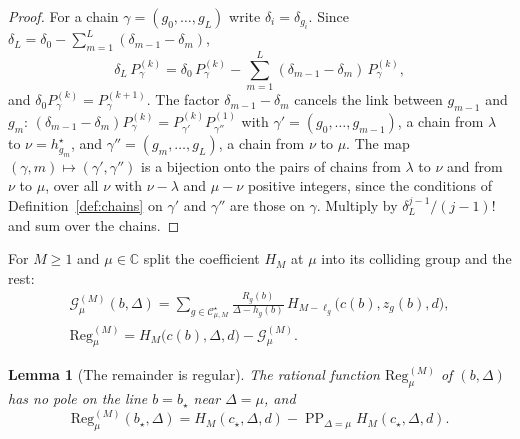 \documentclass[twoside,10pt]{article}
\numberwithin{equation}{section}
\theoremstyle{slbody}
\newtheorem{lemma}[theorem]{Lemma}
\theoremstyle{definition}
\theoremstyle{remark}
\newcommand{\PP}{\operatorname{PP}}
\begin{document}
\begin{proof}
For a chain $\gamma=(g_0,\dots,g_L)$ write $\delta_i=\delta_{g_i}$.  Since
$\delta_L=\delta_0-\sum_{m=1}^{L}(\delta_{m-1}-\delta_m)$,
\[
 \delta_L\,P^{(k)}_\gamma=\delta_0\,P^{(k)}_\gamma
 -\sum_{m=1}^{L}(\delta_{m-1}-\delta_m)\,P^{(k)}_\gamma ,
\]
and $\delta_0P^{(k)}_\gamma=P^{(k+1)}_\gamma$.  The factor
$\delta_{m-1}-\delta_m$ cancels the link between $g_{m-1}$ and $g_m$:
$(\delta_{m-1}-\delta_m)P^{(k)}_\gamma=P^{(k)}_{\gamma'}P^{(1)}_{\gamma''}$
with $\gamma'=(g_0,\dots,g_{m-1})$, a chain from $\lambda$ to $\nu=h^\star_{g_m}$,
and $\gamma''=(g_m,\dots,g_L)$, a chain from $\nu$ to $\mu$.  The map
$(\gamma,m)\mapsto(\gamma',\gamma'')$ is a bijection onto the pairs of chains
from $\lambda$ to $\nu$ and from $\nu$ to $\mu$, over all $\nu$ with
$\nu-\lambda$ and $\mu-\nu$ positive integers, since the conditions of
Definition~\ref{def:chains} on $\gamma'$ and $\gamma''$ are those on $\gamma$.
Multiply by $\delta_L^{j-1}/(j-1)!$ and sum over the chains.
\end{proof}

For $M\geq1$ and $\mu\in\mathbb C$ split the coefficient $H_M$ at $\mu$ into
its colliding group and the rest:
\begin{gather*}
 {\mathcal G}^{(M)}_\mu(b,\Delta)=\sum_{g\in{\mathcal C}^\star_{\mu,M}}
 \frac{R_g(b)}{\Delta-h_g(b)}\,H_{M-\ell_g}\bigl(c(b),z_g(b),d\bigr),\\
 \mathrm{Reg}^{(M)}_\mu=H_M\bigl(c(b),\Delta,d\bigr)-{\mathcal G}^{(M)}_\mu .
\end{gather*}

\begin{lemma}[The remainder is regular]\label{lem:regular-remainder}
The rational function $\mathrm{Reg}^{(M)}_\mu$ of $(b,\Delta)$ has no pole on
the line $b=b_\star$ near $\Delta=\mu$, and
\begin{equation}\label{eq:regvalue}
 \mathrm{Reg}^{(M)}_\mu(b_\star,\Delta)
 =H_M(c_\star,\Delta,d)-\PP_{\Delta=\mu}H_M(c_\star,\Delta,d).
\end{equation}
\end{lemma}
\end{document}
